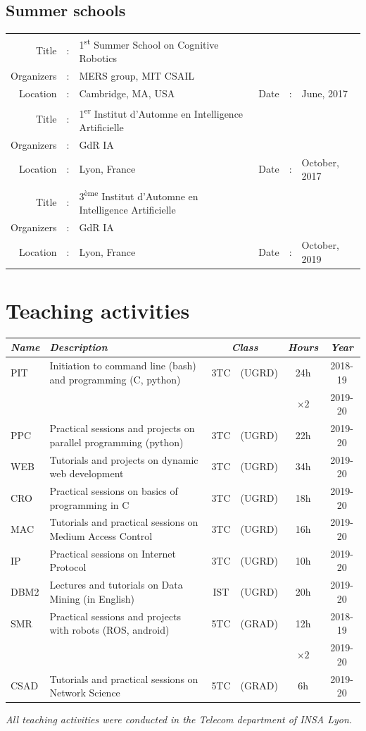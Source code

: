 \documentclass[a4paper,11pt]{article}
\newcommand{\useicon}[1]{\raisebox{-3pt}{\texttt{[image: ./icons/\#1.png]}}}
\begin{document}
\subsection*{Summer schools}
\centering
\begin{tabular}{r c l r c l}
	Title &: &1\textsuperscript{st} Summer School on Cognitive Robotics \\
	Organizers &: &MERS group, MIT CSAIL \\
	Location &: &Cambridge, MA, USA &Date &: &June, 2017 \\
	\hline
	Title &: &1\textsuperscript{er} Institut d'Automne en Intelligence Artificielle \\
	Organizers &: &GdR IA \\
	Location &: &Lyon, France       &Date &: &October, 2017 \\
	\hline
	Title &: &3\textsuperscript{{\`e}me} Institut d'Automne en Intelligence Artificielle \\
	Organizers &: &GdR IA \\
	Location &: &Lyon, France       &Date &: &October, 2019 \\
\end{tabular}
\flushleft

\section*{\useicon{teach} Teaching activities}
\begin{tabularx}{\textwidth}{l X c c c c}
	\itshape Name &\itshape Description &\multicolumn{2}{c}{\itshape Class} &\itshape Hours &\itshape Year \\
	\hline
	PIT  &Initiation to command line (bash) and programming (C, python)
		&3TC &(UGRD) &24h        &2018-19 \\
		&&&          &$\times 2$ &2019-20 \\
	PPC  &Practical sessions and projects on parallel programming (python)
		&3TC &(UGRD) &22h &2019-20 \\
	WEB  &Tutorials and projects on dynamic web development
		&3TC &(UGRD) &34h &2019-20 \\
	CRO  &Practical sessions on basics of programming in C
		&3TC &(UGRD) &18h &2019-20 \\
	MAC  &Tutorials and practical sessions on Medium Access Control
		&3TC &(UGRD) &16h &2019-20 \\
	IP   &Practical sessions on Internet Protocol
		&3TC &(UGRD) &10h &2019-20 \\
	DBM2 &Lectures and tutorials on Data Mining (in English)
		&IST &(UGRD) &20h &2019-20 \\
	SMR  &Practical sessions and projects with robots (ROS, android)
		&5TC &(GRAD) &12h        &2018-19 \\
		&&&          &$\times 2$ &2019-20 \\
	CSAD &Tutorials and practical sessions on Network Science
		&5TC &(GRAD) &6h  &2019-20 \\
\end{tabularx}
\flushright
{\itshape All teaching activities were conducted in the Telecom department of INSA Lyon.}
\flushleft
\end{document}
